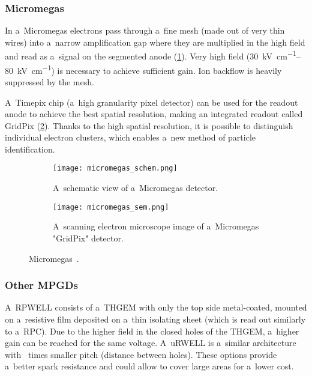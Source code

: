 			\subsubsection{Micromegas}
				In a~\ac{Micromegas} electrons pass through a~fine mesh (made out of very thin wires) into a~narrow amplification gap where they are multiplied in the high field and read as a~signal on the segmented anode (\cref{fig:micromegas_schem}). Very high field (\qtyrange{30}{80}{\kV\per\cm}) is necessary to achieve sufficient gain. Ion backflow is heavily suppressed by the mesh. 
				
				A~Timepix chip (a~high granularity pixel detector) can be used for the readout anode to achieve the best spatial resolution, making an integrated readout called GridPix (\cref{fig:micromegas_sem}). Thanks to the high spatial resolution, it is possible to distinguish individual electron clusters, which enables a~new method of particle identification.
				
				\begin{figure}
					\centering
					\begin{subfigure}[t]{0.54\textwidth}
						\centering
						\texttt{[image: micromegas\_schem.png]}
						\caption{A~schematic view of a~\ac{Micromegas} detector.}
						\label{fig:micromegas_schem}
					\end{subfigure}
					\hfill
					\begin{subfigure}[t]{0.44\textwidth}
						\centering
						\texttt{[image: micromegas\_sem.png]}
						\caption{A~scanning electron microscope image of a~\ac{Micromegas} "GridPix" detector.}
						\label{fig:micromegas_sem}
					\end{subfigure}
					\caption{\acf{Micromegas}~\cite{pdg2024}.}
					\label{fig:micromegas}
				\end{figure}
			
			\subsubsection{Other MPGDs}
				A~\ac{RPWELL} consists of a~\ac{THGEM} with only the top side metal-coated, mounted on a~resistive film deposited on a~thin isolating sheet (which is read out similarly to a~\ac{RPC}). Due to the higher field in the closed holes of the \ac{THGEM}, a~higher gain can be reached for the same voltage. A~\ac{uRWELL} is a~similar architecture with ~times smaller pitch (distance between holes). These options provide a~better spark resistance and could allow to cover large areas for a~lower cost.
				
